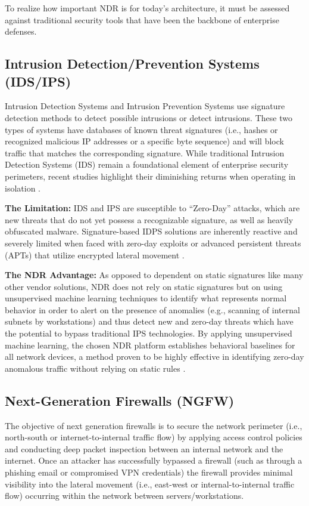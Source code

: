 \documentclass[12pt,a4paper]{report}
\begin{document}
To realize how important NDR is for today's architecture, it must be assessed against traditional security tools that have been the backbone of enterprise defenses.

\subsection{Intrusion Detection/Prevention Systems (IDS/IPS)}

Intrusion Detection Systems and Intrusion Prevention Systems use signature detection methods to detect possible intrusions or detect intrusions. These two types of systems have databases of known threat signatures (i.e., hashes or recognized malicious IP addresses or a specific byte sequence) and will block traffic that matches the corresponding signature. While traditional Intrusion Detection Systems (IDS) remain a foundational element of enterprise security perimeters, recent studies highlight their diminishing returns when operating in isolation \cite{diana2025}.

\textbf{The Limitation:} IDS and IPS are susceptible to ``Zero-Day'' attacks, which are new threats that do not yet possess a recognizable signature, as well as heavily obfuscated malware. Signature-based IDPS solutions are inherently reactive and severely limited when faced with zero-day exploits or advanced persistent threats (APTs) that utilize encrypted lateral movement \cite{abdulganiyu2023}.

\textbf{The NDR Advantage:} As opposed to dependent on static signatures like many other vendor solutions, NDR does not rely on static signatures but on using unsupervised machine learning techniques to identify what represents normal behavior in order to alert on the presence of anomalies (e.g., scanning of internal subnets by workstations) and thus detect new and zero-day threats which have the potential to bypass traditional IPS technologies. By applying unsupervised machine learning, the chosen NDR platform establishes behavioral baselines for all network devices, a method proven to be highly effective in identifying zero-day anomalous traffic without relying on static rules \cite{irabaruta2025}.

\subsection{Next-Generation Firewalls (NGFW)}

The objective of next generation firewalls is to secure the network perimeter (i.e., north-south or internet-to-internal traffic flow) by applying access control policies and conducting deep packet inspection between an internal network and the internet. Once an attacker has successfully bypassed a firewall (such as through a phishing email or compromised VPN credentials) the firewall provides minimal visibility into the lateral movement (i.e., east-west or internal-to-internal traffic flow) occurring within the network between servers/workstations.
\end{document}
